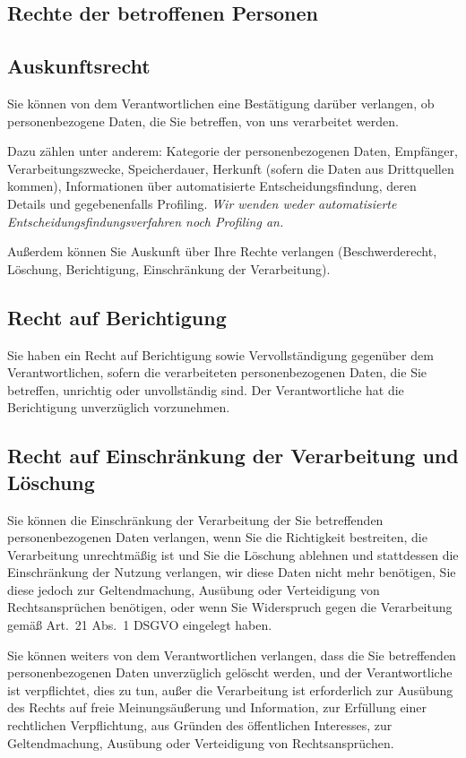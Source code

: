 \documentclass[a4paper, 10pt, headings=normal]{scrartcl}
\begin{document}
\begin{multicols*}{2}
\section{Rechte der betroffenen Personen}

\subsection{Auskunftsrecht}

Sie können von dem Verantwortlichen eine Bestätigung darüber verlangen, ob personenbezogene Daten, die Sie betreffen, von uns verarbeitet werden.

Dazu zählen unter anderem: Kategorie der personenbezogenen Daten, Empfänger, Verarbeitungszwecke, Speicherdauer, Herkunft (sofern die Daten aus Drittquellen kommen), Informationen über automatisierte Entscheidungsfindung, deren Details und gegebenenfalls Profiling.
\emph{Wir wenden weder automatisierte Entscheidungsfindungsverfahren noch Profiling an.}

Außerdem können Sie Auskunft über Ihre Rechte verlangen (Beschwerderecht, Löschung, Berichtigung, Einschränkung der Verarbeitung).

\subsection{Recht auf Berichtigung}

Sie haben ein Recht auf Berichtigung sowie Vervollständigung gegenüber dem Verantwortlichen, sofern die verarbeiteten personenbezogenen Daten, die Sie betreffen, unrichtig oder unvollständig sind.
Der Verantwortliche hat die Berichtigung unverzüglich vorzunehmen.

\subsection{Recht auf Einschränkung der Verarbeitung und Löschung}

Sie können die Einschränkung der Verarbeitung der Sie betreffenden personenbezogenen Daten verlangen, wenn Sie die Richtigkeit bestreiten, die Verarbeitung unrechtmäßig ist und Sie die Löschung ablehnen und stattdessen die Einschränkung der Nutzung verlangen, wir diese Daten nicht mehr benötigen, Sie diese jedoch zur Geltendmachung, Ausübung oder Verteidigung von Rechtsansprüchen benötigen, oder wenn Sie Widerspruch gegen die Verarbeitung gemäß Art.~21 Abs.~1 DSGVO eingelegt haben.

Sie können weiters von dem Verantwortlichen verlangen, dass die Sie betreffenden personenbezogenen Daten unverzüglich gelöscht werden, und der Verantwortliche ist verpflichtet, dies zu tun, außer die Verarbeitung ist erforderlich zur Ausübung des Rechts auf freie Meinungsäußerung und Information, zur Erfüllung einer rechtlichen Verpflichtung, aus Gründen des öffentlichen Interesses, zur Geltendmachung, Ausübung oder Verteidigung von Rechtsansprüchen.


\end{multicols*}
\end{document}
